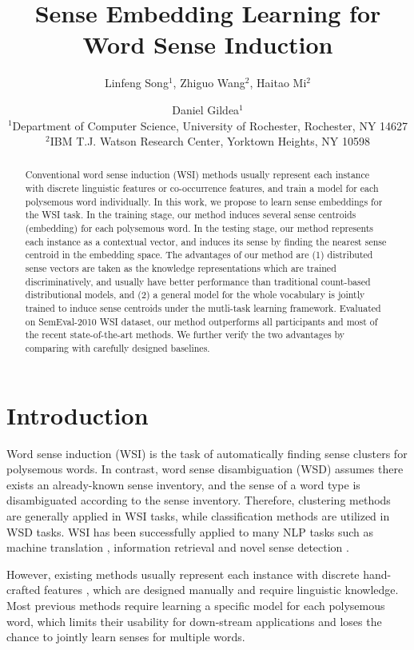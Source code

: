 \documentclass[11pt]{article}
\title{Sense Embedding Learning for Word Sense Induction}
\author{Linfeng Song$^1$, Zhiguo Wang$^2$, Haitao Mi$^2$ \and Daniel Gildea$^1$ \\
  $^1$Department of Computer Science, University of Rochester, Rochester, NY 14627 \\
  $^2$IBM T.J. Watson Research Center, Yorktown Heights, NY 10598  \\
  }
\date{}
\begin{document}
\maketitle

\begin{abstract}
Conventional word sense induction (WSI) methods usually represent each instance with discrete linguistic features or co-occurrence features, and train a model for each polysemous word individually. 
In this work, we propose to learn sense embeddings for the WSI task. 
In the training stage, our method induces several sense centroids (embedding) for each polysemous word. 
In the testing stage, our method represents each instance as a contextual vector, and induces its sense by finding the nearest sense centroid in the embedding space. 
The advantages of our method are 
(1) distributed sense vectors are taken as the knowledge representations which are trained discriminatively, and usually have better performance than traditional count-based distributional models,
and (2) a general model for the whole vocabulary is jointly trained to induce sense centroids under the mutli-task learning framework. 
Evaluated on SemEval-2010 WSI dataset, our method outperforms all participants and most of the recent state-of-the-art methods.
We further verify the two advantages by comparing with carefully designed baselines.
\end{abstract}


\section{Introduction}

Word sense induction (WSI) is the task of automatically finding sense clusters for polysemous words. In contrast, 
word sense disambiguation (WSD) assumes there exists an already-known sense inventory, 
and the sense of a word type is disambiguated according to the sense inventory.
Therefore, clustering methods are generally applied in WSI tasks, while classification methods are utilized in WSD tasks.
WSI has been successfully applied to many NLP tasks such as machine translation \cite{xiong-zhang:2014:P14-1}, information retrieval \cite{navigli-crisafulli:2010:EMNLP} and novel sense detection \cite{lau-EtAl:2012:EACL2012}.

However, existing methods usually represent each instance with discrete hand-crafted features \cite{bordag2006word,chen-EtAl:2009:NAACLHLT091,vandecruys-apidianaki:2011:ACL-HLT2011,purandare-pedersen:2004:CONLL}, 
which are designed manually and require linguistic knowledge.
Most previous methods require learning a specific model for each polysemous word, which limits their usability for down-stream applications and loses the chance to jointly learn senses for multiple words.
\end{document}

